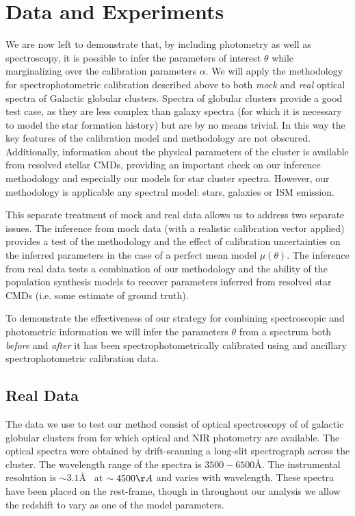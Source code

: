 \documentclass[iop,numberedappendix]{emulateapj}
\begin{document}
\section{Data and Experiments}

We are now left to demonstrate that, by including photometry as well
as spectroscopy, it is possible to infer the parameters of interest
$\theta$ while marginalizing over the calibration parameters $\alpha$.
We will apply the methodology for spectrophotometric calibration
described above to both \emph{mock} and \emph{real} optical spectra of
Galactic globular clusters.  Spectra of globular clusters provide a
good test case, as they are less complex than galaxy spectra (for
which it is necessary to model the star formation history) but are by
no means trivial. In this way the key features of the calibration
model and methodology are not obscured.  Additionally, information
about the physical parameters of the cluster is available from
resolved stellar CMDs, providing an important check on our inference
methodology and especially our models for star cluster spectra.  However,
our methodology is applicable any spectral model: stars, galaxies or
ISM emission.

This separate treatment of mock and real data allows us to address two
separate issues.  The inference from mock data (with a realistic
calibration vector applied) provides a test of the methodology and the
effect of calibration uncertainties on the inferred parameters in the
case of a perfect mean model $\mu(\theta)$.  The inference from real
data tests a combination of our methodology and the ability of the
population synthesis models to recover parameters inferred from
resolved star CMDs (i.e. some estimate of ground truth).

To demonstrate the effectiveness of our strategy for combining
spectroscopic and photometric information we will infer the parameters
$\theta$ from a spectrum both \emph{before} and \emph{after} it has
been spectrophotometrically calibrated using and ancillary
spectrophotometric calibration data.


\subsection{Real Data}

The data we use to test our method consist of optical spectroscopy of
of galactic globular clusters from \citet{schiavon05} for which
optical and NIR photometry are available. The optical spectra were
obtained by drift-scanning a long-slit spectrograph across the
cluster.  The wavelength range of the spectra is $3500-6500$\AA. The
instrumental resolution is $\sim 3.1$\AA~ at $\sim 4500\AA$ and varies
with wavelength.  These spectra have been placed on the rest-frame,
though in throughout our analysis we allow the redshift to vary as one
of the model parameters. 
\end{document}
